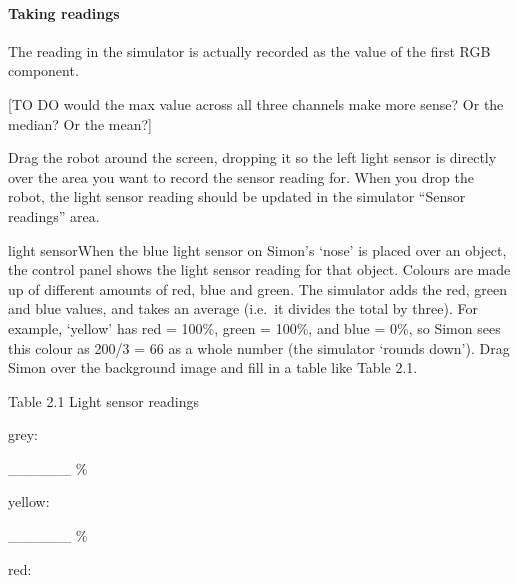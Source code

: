 \documentclass[letterpaper,10pt,english]{sphinxmanual}
\begin{document}
\paragraph{Taking readings}
\label{\detokenize{content/04_Robot_Lab/Section_00_02:Taking-readings}}
The  reading in the simulator is actually recorded as the value of the first RGB component.

{[}TO DO \sphinxhyphen{} would the max value across all three channels make more sense? Or the median? Or the mean?{]}

Drag the robot around the screen, dropping it so the left light sensor is directly over the area you want to record the sensor reading for. When you drop the robot, the light sensor reading should be updated in the simulator “Sensor readings” area.

light sensorWhen the blue light sensor on Simon’s ‘nose’ is placed over an object, the control panel shows the light sensor reading for that object. Colours are made up of different amounts of red, blue and green. The simulator adds the red, green and blue values, and takes an average (i.e. it divides the total by three). For example, ‘yellow’ has red = 100\%, green = 100\%, and blue = 0\%, so Simon sees this colour as 200/3 = 66 as a whole number (the simulator ‘rounds down’). Drag Simon over the
background image and fill in a table like Table 2.1.





Table 2.1 Light sensor readings









grey:





\_\_\_\_\_\_ \%









yellow:





\_\_\_\_\_\_ \%









red:
\end{document}
